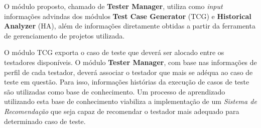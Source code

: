 O módulo proposto, chamado de \textbf{Tester Manager}, utiliza como \textit{input} informações advindas dos módulos \textbf{Test Case Generator} (TCG) e \textbf{Historical Analyzer} (HA), além de informações diretamente obtidas a partir da ferramenta de gerenciamento de projetos utilizada.

O módulo TCG exporta o caso de teste que deverá ser alocado entre os testadores disponíveis. O módulo \textbf{Tester Manager}, com base nas informações de perfil de cada testador, deverá associar o testador que mais se adéqua ao caso de teste em questão. Para isso, informações histórias da execução de casos de teste são utilizadas como base de conhecimento. Um processo de aprendizado utilizando esta base de conhecimento viabiliza a implementação de um \textit{Sistema de Recomendação} que seja capaz de recomendar o testador mais adequado para determinado caso de teste.